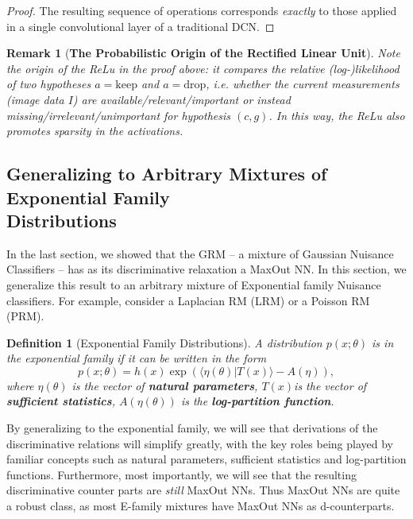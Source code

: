 \documentclass[12pt]{article}
\newtheorem{definition}[theorem]{Definition}
\newtheorem{remark}[theorem]{Remark}
\begin{document}
\begin{proof}
The resulting sequence of operations corresponds \emph{exactly} to those applied in a single convolutional layer of a traditional DCN.
\end{proof}\begin{remark}[\textbf{The Probabilistic Origin of the Rectified Linear Unit}] \sloppy
Note the origin of the ReLu in the proof above: it compares the relative (log-)likelihood of two hypotheses $a=\textrm{keep}$ and $a=\textrm{drop}$, i.e. whether the current measurements (image data $I$) are available/relevant/important or instead missing/irrelevant/unimportant for hypothesis $(c,g)$. In this way, the ReLu also promotes sparsity in the activations.
\end{remark}\subsection{Generalizing to Arbitrary Mixtures of Exponential Family \\ Distributions}\label{sec:generalize-exp-fam}

In the last section, we showed that the GRM -- a mixture of Gaussian Nuisance Classifiers -- has as its discriminative relaxation a MaxOut NN. In this section, we generalize this result to an arbitrary mixture of Exponential family Nuisance classifiers. For example, consider a Laplacian RM (LRM) or a Poisson RM (PRM). 

\begin{definition}[Exponential Family Distributions] \label{defn:ExpFamily}
 A distribution $p(x;\theta)$ is in the exponential family if it can be written in the form
 \[
 	p(x;\theta) = h(x) \exp ( \langle \eta(\theta) | T(x) \rangle - A(\eta)),
 \]
 where $\eta(\theta)$ is the vector of \textbf{natural parameters}, $T(x)$is the vector of \textbf{sufficient statistics}, $A(\eta(\theta))$ is the \textbf{log-partition function}.
\end{definition}

By generalizing to the exponential family, we will see that derivations of the discriminative relations will simplify greatly, with the key roles being played by familiar concepts such as natural parameters, sufficient statistics and log-partition functions. Furthermore, most importantly, we will see that the resulting discriminative counter parts are \emph{still} MaxOut NNs. Thus MaxOut NNs are quite a robust class, as most E-family mixtures have MaxOut NNs as d-counterparts.
\end{document}
